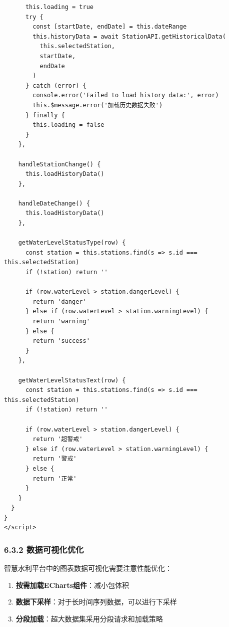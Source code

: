\begin{lstlisting}
      this.loading = true
      try {
        const [startDate, endDate] = this.dateRange
        this.historyData = await StationAPI.getHistoricalData(
          this.selectedStation,
          startDate,
          endDate
        )
      } catch (error) {
        console.error('Failed to load history data:', error)
        this.$message.error('加载历史数据失败')
      } finally {
        this.loading = false
      }
    },
    
    handleStationChange() {
      this.loadHistoryData()
    },
    
    handleDateChange() {
      this.loadHistoryData()
    },
    
    getWaterLevelStatusType(row) {
      const station = this.stations.find(s => s.id === this.selectedStation)
      if (!station) return ''
      
      if (row.waterLevel > station.dangerLevel) {
        return 'danger'
      } else if (row.waterLevel > station.warningLevel) {
        return 'warning'
      } else {
        return 'success'
      }
    },
    
    getWaterLevelStatusText(row) {
      const station = this.stations.find(s => s.id === this.selectedStation)
      if (!station) return ''
      
      if (row.waterLevel > station.dangerLevel) {
        return '超警戒'
      } else if (row.waterLevel > station.warningLevel) {
        return '警戒'
      } else {
        return '正常'
      }
    }
  }
}
</script>
\end{lstlisting}

\subsubsection{6.3.2
数据可视化优化}\label{ux6570ux636eux53efux89c6ux5316ux4f18ux5316}

智慧水利平台中的图表数据可视化需要注意性能优化：

\begin{enumerate}
\def\labelenumi{\arabic{enumi}.}
\tightlist
\item
  \textbf{按需加载ECharts组件}：减小包体积
\item
  \textbf{数据下采样}：对于长时间序列数据，可以进行下采样
\item
  \textbf{分段加载}：超大数据集采用分段请求和加载策略
\end{enumerate}


